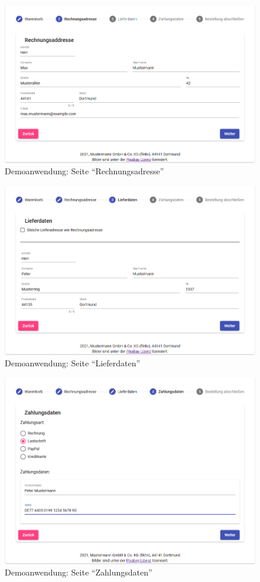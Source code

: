 \begin{figure}[H]
	\centering
	\includegraphics[width=0.75\linewidth]{img/04_erstellung-poc/demoanwendung_vorstellung_02-rechnungsadresse.png}
	\caption{Demoanwendung: Seite \enquote{Rechnungsadresse}}
	\label{fig:demoanwendung_vorstellung_02-rechnungsadresse}
\end{figure}

\begin{figure}[H]
	\centering
	\includegraphics[width=0.75\linewidth]{img/04_erstellung-poc/demoanwendung_vorstellung_03-lieferdaten.png}
	\caption{Demoanwendung: Seite \enquote{Lieferdaten}}
	\label{fig:demoanwendung_vorstellung_03-lieferdaten}
\end{figure}

\begin{figure}[H]
	\centering
	\includegraphics[width=0.75\linewidth]{img/04_erstellung-poc/demoanwendung_vorstellung_04-zahlungsdaten.png}
	\caption{Demoanwendung: Seite \enquote{Zahlungsdaten}}
	\label{fig:demoanwendung_vorstellung_04-zahlungsdaten}
\end{figure}

